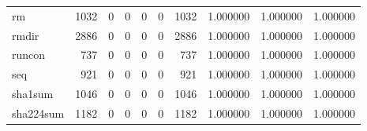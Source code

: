 \begin{tabular}{lrrrrrrrrr}
rm        &                                               1032 &                                                  0 &                                                  0 &                                                  0 &                                                  0 &                                               1032 &                                           1.000000 &                               1.000000 &                             1.000000 \\
rmdir     &                                               2886 &                                                  0 &                                                  0 &                                                  0 &                                                  0 &                                               2886 &                                           1.000000 &                               1.000000 &                             1.000000 \\
runcon    &                                                737 &                                                  0 &                                                  0 &                                                  0 &                                                  0 &                                                737 &                                           1.000000 &                               1.000000 &                             1.000000 \\
seq       &                                                921 &                                                  0 &                                                  0 &                                                  0 &                                                  0 &                                                921 &                                           1.000000 &                               1.000000 &                             1.000000 \\
sha1sum   &                                               1046 &                                                  0 &                                                  0 &                                                  0 &                                                  0 &                                               1046 &                                           1.000000 &                               1.000000 &                             1.000000 \\
sha224sum &                                               1182 &                                                  0 &                                                  0 &                                                  0 &                                                  0 &                                               1182 &                                           1.000000 &                               1.000000 &                             1.000000 \\

\end{tabular}
